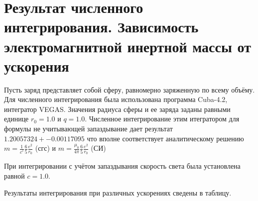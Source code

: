 \documentclass{article}
\begin{document}
\section{Результат численного интегрирования. Зависимость электромагнитной инертной массы от ускорения}

Пусть заряд представляет собой сферу, равномерно заряженную по всему объёму.
Для численного интегрирования была использована программа Cuba-4.2, интегратор VEGAS.
Значения радиуса сферы и ее заряда заданы равными единице $r_{0} = 1.0$ и $q = 1.0$.
Численное интегрирование этим итегратором для формулы не учитывающей запаздывание дает результат
$1.20057324 +- 0.00117095$ что вполне соответствует аналитическому решению
$m =\frac{1}{{{c}^{^{2}}}}\frac{6}{5}\frac{e^2}{{{r}_{0}}}$ (сгс) и
$m =\frac{{{\mu }_{0}}}{4\pi }\frac{6}{5}\frac{e^2}{{{r}_{0}}}$ (СИ)

При интегрировании с учётом запаздывания скорость света была установлена равной $c = 1.0$.

Результаты интегрирования при различных ускорениях сведены в таблицу.
\end{document}
